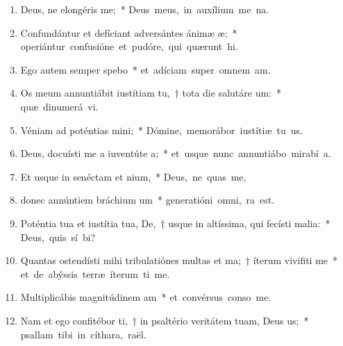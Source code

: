 \begin{flushleft}
\begin{enumerate}[leftmargin=*]
\item Deus, ne elongéris  me;~* \mbox{Deus meus, in auxílium me na.}

\item Confundántur et defíciant adversántes ánimæ æ;~* \mbox{operiántur confusióne et pudóre, qui quærunt  hi.}

\item Ego autem semper spebo~* \mbox{et adíciam super omnem  am.}

\item Os meum annuntiábit iustítiam tu,~† tota die salutáre um:~* \mbox{quæ dinumerá vi.}

\item Véniam ad poténtias mini;~* \mbox{Dómine, memorábor iustítiæ tu us.}

\item Deus, docuísti me a iuventúte a;~* \mbox{et usque nunc annuntiábo mirabí a.}

\item Et usque in senéctam et nium,~* \mbox{Deus, ne quas me,}

\item donec annúntiem bráchium um~* \mbox{generatióni omni,  ra est.}

\item Poténtia tua et iustítia tua, De,~† usque in altíssima, qui fecísti malia:~* \mbox{Deus, quis sí bi?}

\item Quantas ostendísti mihi tribulatiónes multas et ma;~† íterum vivifiti me~* \mbox{et de abýssis terræ íterum ti me.}

\item Multiplicábis magnitúdinem am~* \mbox{et convérsus conso me.}

\item Nam et ego confitébor ti,~† in psaltério veritátem tuam, Deus us;~* \mbox{psallam tibi in cíthara,  raël.}


\end{enumerate}
\end{flushleft}
